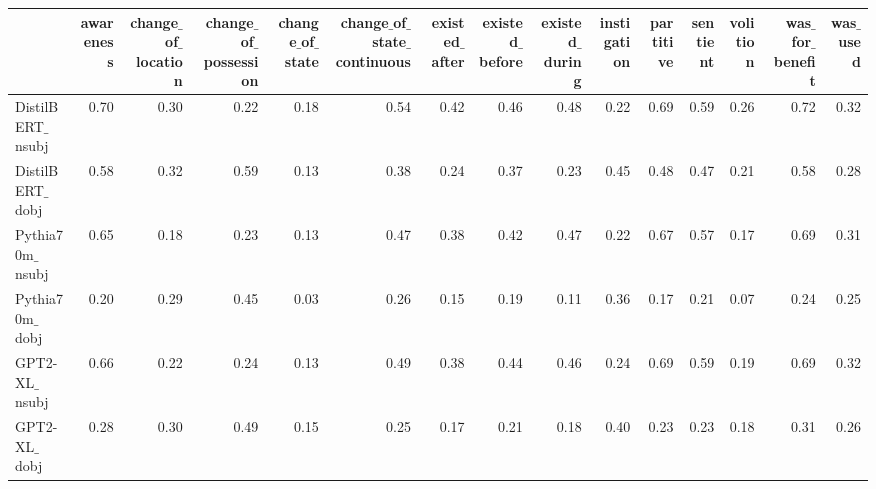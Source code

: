 \begin{tabular}{lrrrrrrrrrrrrrr}
\toprule
 & awareness & change$\_$of$\_$location & change$\_$of$\_$possession & change$\_$of$\_$state & change$\_$of$\_$state$\_$continuous & existed$\_$after & existed$\_$before & existed$\_$during & instigation & partitive & sentient & volition & was$\_$for$\_$benefit & was$\_$used \\
\midrule
DistilBERT$\_$nsubj & 0.70 & 0.30 & 0.22 & 0.18 & 0.54 & 0.42 & 0.46 & 0.48 & 0.22 & 0.69 & 0.59 & 0.26 & 0.72 & 0.32 \\
DistilBERT$\_$dobj & 0.58 & 0.32 & 0.59 & 0.13 & 0.38 & 0.24 & 0.37 & 0.23 & 0.45 & 0.48 & 0.47 & 0.21 & 0.58 & 0.28 \\
Pythia70m$\_$nsubj & 0.65 & 0.18 & 0.23 & 0.13 & 0.47 & 0.38 & 0.42 & 0.47 & 0.22 & 0.67 & 0.57 & 0.17 & 0.69 & 0.31 \\
Pythia70m$\_$dobj & 0.20 & 0.29 & 0.45 & 0.03 & 0.26 & 0.15 & 0.19 & 0.11 & 0.36 & 0.17 & 0.21 & 0.07 & 0.24 & 0.25 \\
GPT2-XL$\_$nsubj & 0.66 & 0.22 & 0.24 & 0.13 & 0.49 & 0.38 & 0.44 & 0.46 & 0.24 & 0.69 & 0.59 & 0.19 & 0.69 & 0.32 \\
GPT2-XL$\_$dobj & 0.28 & 0.30 & 0.49 & 0.15 & 0.25 & 0.17 & 0.21 & 0.18 & 0.40 & 0.23 & 0.23 & 0.18 & 0.31 & 0.26 \\
\bottomrule
\end{tabular}
